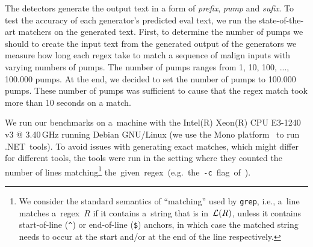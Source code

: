 \documentclass[acmsmall,screen]{acmart}
\begin{document}
%
The detectors generate the output text in a form of \emph{prefix}, \emph{pump} and \emph{sufix}.
%
To test the accuracy of each generator's predicted eval text, we run the state-of-the-art matchers on the generated text.
%
First, to determine the number of pumps we should to create the input text from the generated output of the generators
%
we measure how long each regex take to match a sequence of malign inputs with varying numbers of pumps. 
%
The number of pumps ranges from 1, 10, 100, ..., 100.000 pumps. 
%
At the end, we decided to set the number of pumps to 100.000 pumps.
%
These number of pumps was sufficient to cause that the regex match took more than 10 seconds on a match.


We run our benchmarks on a~machine with the Intel(R) Xeon(R) CPU E3-1240 v3 @
3.40\,GHz running Debian GNU/Linux (we use the Mono
platform~\cite{mono} to run .NET~tools).
To avoid issues with generating exact matches,
which might differ for different tools,
the tools were run in the setting where they counted the number of lines
matching\footnote{%
We consider the standard semantics of ``matching'' used by \texttt{grep}, i.e.,
a~line matches a~regex~$R$ if it contains a~string that is in~$\mathcal{L}(R)$, unless it
contains start-of-line (\texttt{\^}) or end-of-line (\texttt{\$}) anchors, in which
case the matched string needs to occur at the start and/or at the end of the
line respectively.
}
\mbox{the given regex (e.g.\ the \texttt{-c} flag of \grep).}


%

\vspace{-0.0mm}
\end{document}
